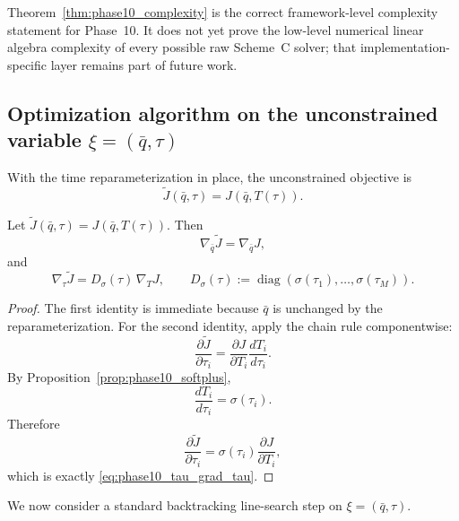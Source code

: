 \begin{remark}
\label{rem:phase10_complexity_scope}
Theorem~\ref{thm:phase10_complexity} is the correct framework-level complexity statement for Phase~10.
It does not yet prove the low-level numerical linear algebra complexity of every possible raw Scheme~C solver; that implementation-specific layer remains part of future work.
\end{remark}

\subsection{Optimization algorithm on the unconstrained variable \texorpdfstring{$\xi=(\bar q,\tau)$}{xi}}
\label{subsec:phase10_optimizer}

With the time reparameterization in place, the unconstrained objective is
\[
\widetilde J(\bar q,\tau)
=
J(\bar q,T(\tau)).
\]

\begin{proposition}
\label{prop:phase10_tau_gradient}
Let \(\widetilde J(\bar q,\tau)=J(\bar q,T(\tau))\).
Then
\begin{equation}
\label{eq:phase10_tau_grad_q}
\nabla_{\bar q}\widetilde J
=
\nabla_{\bar q}J,
\end{equation}
and
\begin{equation}
\label{eq:phase10_tau_grad_tau}
\nabla_{\tau}\widetilde J
=
D_{\sigma}(\tau)\,\nabla_T J,
\qquad
D_{\sigma}(\tau):=\operatorname{diag}(\sigma(\tau_1),\dots,\sigma(\tau_M)).
\end{equation}
\end{proposition}

\begin{proof}
The first identity is immediate because \(\bar q\) is unchanged by the reparameterization.
For the second identity, apply the chain rule componentwise:
\[
\frac{\partial \widetilde J}{\partial \tau_i}
=
\frac{\partial J}{\partial T_i}\frac{dT_i}{d\tau_i}.
\]
By Proposition~\ref{prop:phase10_softplus},
\[
\frac{dT_i}{d\tau_i}=\sigma(\tau_i).
\]
Therefore
\[
\frac{\partial \widetilde J}{\partial \tau_i}
=
\sigma(\tau_i)\frac{\partial J}{\partial T_i},
\]
which is exactly \eqref{eq:phase10_tau_grad_tau}.
\end{proof}

We now consider a standard backtracking line-search step on \(\xi=(\bar q,\tau)\).

